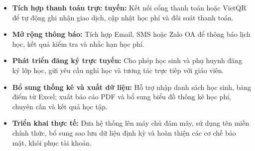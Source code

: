 \begin{itemize}

    \item \textbf{Tích hợp thanh toán trực tuyến:} Kết nối cổng thanh toán hoặc VietQR để tự động ghi nhận giao dịch, cập nhật học phí và đối soát thanh toán.

    \item \textbf{Mở rộng thông báo:} Tích hợp Email, SMS hoặc Zalo OA để thông báo lịch học, kết quả kiểm tra và nhắc hạn học phí.

    \item \textbf{Phát triển đăng ký trực tuyến:} Cho phép học sinh và phụ huynh đăng ký lớp học, gửi yêu cầu nghỉ học và tương tác trực tiếp với giáo viên.

    \item \textbf{Bổ sung thống kê và xuất dữ liệu:} Hỗ trợ nhập danh sách học sinh, bảng điểm từ Excel; xuất báo cáo PDF và bổ sung biểu đồ thống kê học phí, chuyên cần và kết quả học tập.

    \item \textbf{Triển khai thực tế:} Đưa hệ thống lên máy chủ đám mây, sử dụng tên miền chính thức, bổ sung sao lưu dữ liệu định kỳ và hoàn thiện các cơ chế bảo mật, khôi phục tài khoản.
\end{itemize}